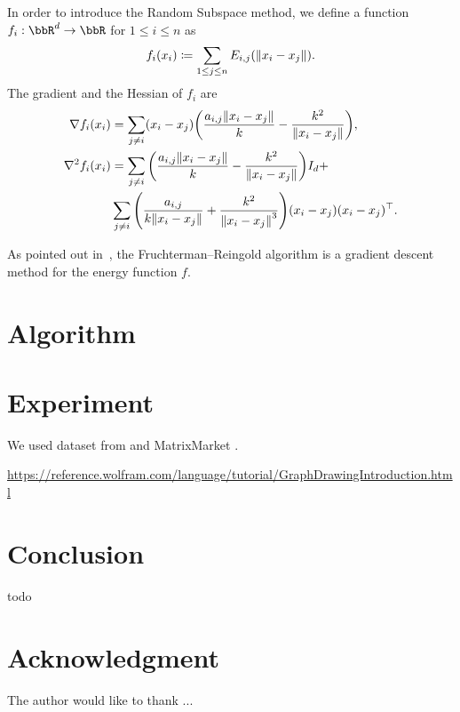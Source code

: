 \documentclass[journal]{IEEEtran}
\newcommand{\defeq}{\coloneqq}
\begin{document}
In order to introduce the Random Subspace method, we define a function $f_i: \bbR^{d} \to \bbR$ for $1 \leq i \leq n$ as
\begin{equation*}
  f_i(x_i) \defeq \sum_{1 \leq j \leq n} E_{i,j}(\norm{x_i - x_j}).
\end{equation*}
The gradient and the Hessian of $f_i$ are
\begin{align*}
  \nabla f_i(x_i)   & = \sum_{j \neq i} (x_i-x_j) \qty(\frac{a_{i,j}\norm{x_i-x_j}}{k} - \frac{k^2}{\norm{x_i - x_j}}),                    \\
  \nabla^2 f_i(x_i) & = \sum_{j \neq i} \qty(\frac{a_{i,j}\norm{x_i-x_j}}{k} - \frac{k^2}{\norm{x_i - x_j}}) I_d +                         \\
                    & \sum_{j \neq i} \qty(\frac{a_{i,j}}{k \norm{x_i-x_j}} + \frac{k^2}{\norm{x_i - x_j}^3}) (x_i - x_j)(x_i - x_j)^\top.
\end{align*}

As pointed out in~\cite{tunkelang1999numerical},
the Fruchterman--Reingold algorithm is a gradient descent method for the energy function $f$.


\section{Algorithm} \label{sec:algorithm}

\section{Experiment} \label{sec:experiment}

We used dataset from \cite{davis2011university} and MatrixMarket \cite{boisvertMatrixMarketWeb1997}.

\url{https://reference.wolfram.com/language/tutorial/GraphDrawingIntroduction.html}

\section{Conclusion} \label{sec:conclusion}

todo

\section*{Acknowledgment}

The author would like to thank ...

\end{document}
